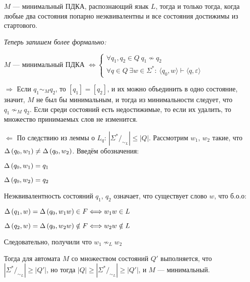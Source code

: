 \Th $M$ — минимальный ПДКА, распознающий язык $L$, тогда и только тогда, когда любые два состояния попарно неэквивалентны и все состояния достижимы из стартового.

\textit{Теперь запишем более формально:}

\begin{center}
    $M$ — минимальный ПДКА $\Longleftrightarrow \begin{cases} \forall q_1, q_2 \in Q \ q_1 \nsim q_2 \\ \forall q \in Q \ \exists w \in \Sigma^* : \ \langle q_0, w \rangle \vdash \langle q, \varepsilon \rangle \end{cases}$
\end{center}

\Proof

$\Longrightarrow$ Если $q_1 \sim_M q_2$, то $[q_1] = [q_2]$, и их можно объединить в одно состояние, значит, $M$ не был бы минимальным, и тогда из минимальности следует, что $q_1 \nsim_M q_2$. Если среди состояний есть недостижимые, то если их удалить, то множество принимаемых слов не изменится.

$\Longleftarrow$ По следствию из леммы о $L_q$: $|\Sigma^* /_{\sim_L}| \leqslant |Q|$. Рассмотрим $w_1$, $w_2$ такие, что $\Delta \left({q_0, w_1}\right) \neq \Delta \left({q_0, w_2}\right)$. Введём обозначения:

\begin{center}
    $\Delta \left({q_0, w_1}\right) = q_1$
    
    $\Delta \left({q_0, w_2}\right) = q_2$
\end{center}

Неэквивалентность состояний $q_1$, $q_2$ означает, что существует слово $w$, что б.о.о:

\begin{center}
    $\Delta \left({q_1, w}\right) = \Delta \left({q_0, w_1 w}\right) \in F \Longleftrightarrow w_1 w \in L$
    
    $\Delta \left({q_2, w}\right) = \Delta \left({q_0, w_2 w}\right) \notin F \Longleftrightarrow w_2 w \notin L$
    
    Следовательно, получили что $w_1 \nsim_L w_2$
\end{center}

Тогда для автомата $M$ со множеством состояний $Q'$ выполняется, что $|\Sigma^* /_{\sim_L}| \geqslant |Q'|$, но тогда $|Q| \geqslant |\Sigma^* /_{\sim_L}| \geqslant |Q'|$, и $M$ — минимальный. \quad \EndProof